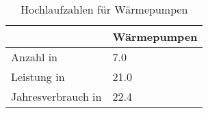 {
\renewcommand{\arraystretch}{1.2}%
\begin{table}[H]
	\begin{center}
		\caption{Hochlaufzahlen für Wärmepumpen}
		\begin{tabu} to 0.6\textwidth {X[1.5] X[1, r]}
			\hline
										 & Wärmepumpen \\ \hline
			Anzahl in \si{\MioStkSC}     & \num{7.0}   \\
			Leistung in \si{\gw}         & \num{21.0}  \\
			Jahresverbrauch in \si{\twh} & \num{22.4}  \\ \hline
		\end{tabu}
		\label{tab:WP-RampUp}
	\end{center}
	\vspace{-3mm}%
\end{table}
}